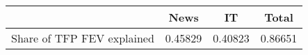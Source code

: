 \begin{small}
	\begin{tabular}{lccc}
	\hline
		& News & IT & Total \\
		\hline
		Share of TFP FEV explained & 0.45829 & 0.40823 & 0.86651 \\
		\hline
	\end{tabular}
\end{small}
